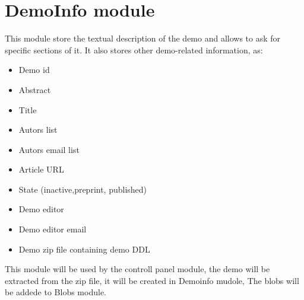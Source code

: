 \section{DemoInfo module}
This module store the textual description of the demo and allows to ask for specific sections of it. It also stores other demo-related information, as:
\begin{itemize}
\item Demo id
\item Abstract
\item Title 
\item Autors list
\item Autors email list
\item Article URL
\item State (inactive,preprint, published)
\item Demo editor
\item Demo editor email
\item Demo zip file containing demo DDL 
\end{itemize}

This module will be used by the controll panel module, the demo will be extracted from the zip file, it will be created in Demoinfo mudole, The blobs will be addede to Blobs module.
